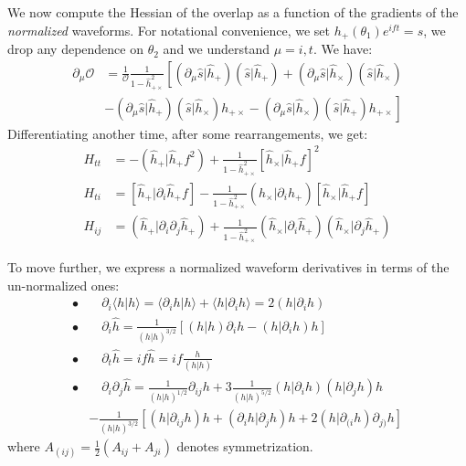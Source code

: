 \documentclass[twocolumn,showpacs,preprintnumbers,nofootinbib,prd,
superscriptaddress,10pt]{revtex4-2}
\newcommand{\scalar}[2]{\langle #1|#2 \rangle}
\newcommand{\rescalar}[2]{( #1 |#2 )}
\newcommand{\imscalar}[2]{[ #1|#2 ]}
\begin{document}
We now compute the Hessian of the overlap as a function of the gradients of the {\it normalized} waveforms. For notational convenience, we set $h_+(\theta_1)e^{ift} = s$, we drop any dependence on $\theta_2$ and we understand $\mu = {i, t}$.
We have:
\begin{align}\label{eq:overlap_grads}
	\partial_{\mu} \mathcal{O} &= \frac{1}{\mathcal{O}} \frac{1}{1-\hat{h}^2_{+\times}}
	\left[
	\rescalar{\partial_\mu\hat{s}}{\hat{h}_+}\rescalar{\hat{s}}{\hat{h}_+} 
	+ \rescalar{\partial_\mu\hat{s}}{\hat{h}_\times}\rescalar{\hat{s}}{\hat{h}_\times} \right. \nonumber \\
	&\left. - \rescalar{\partial_\mu\hat{s}}{\hat{h}_+}\rescalar{\hat{s}}{\hat{h}_\times}h_{+\times}
	- \rescalar{\partial_\mu\hat{s}}{\hat{h}_\times}\rescalar{\hat{s}}{\hat{h}_+}h_{+\times}
	\right]
\end{align}
Differentiating another time, after some rearrangements, we get:
\begin{align}
H_{tt} &= - \rescalar{\hat{h}_+}{\hat{h}_+f^2}
			+ \frac{1}{1-\hat{h}^2_{+\times}} \imscalar{\hat{h}_\times}{\hat{h}_+f}^2 \label{eq:H_tt}\\
H_{ti} &= \imscalar{\hat{h}_+}{\partial_i \hat{h}_+f}
			- \frac{1}{1-\hat{h}^2_{+\times}} \rescalar{\hat{h}_\times}{\partial_i\hat{h}_+} \imscalar{\hat{h}_\times}{\hat{h}_+f} \label{eq:H_ti}\\
H_{ij} &= \rescalar{\hat{h}_+}{\partial_i\partial_j\hat{h}_+}
			+ \frac{1}{1-\hat{h}^2_{+\times}} \rescalar{\hat{h}_\times}{\partial_i\hat{h}_+} \rescalar{\hat{h}_\times}{\partial_j\hat{h}_+} \label{eq:H_ij}
\end{align}

To move further, we express a normalized waveform derivatives in terms of the un-normalized ones:
\begin{align*}
	\bullet&\quad \partial_i \scalar{h}{h} = \scalar{\partial_i h}{h}+ \scalar{h}{\partial_i h} = 2 \rescalar{h}{\partial_i h} \\
	\bullet&\quad \partial_i \hat{h} =\frac{1}{\rescalar{h}{h}^{3/2}} \left[ \rescalar{h}{h}\partial_i h -  \rescalar{h}{\partial_i h} h \right]
	\\
	\bullet &\quad \partial_t \hat{h} = i f \hat{h} = i f \frac{h}{\rescalar{h}{h}} \\
	\bullet &\quad \partial_i \partial_j \hat{h} = \frac{1}{\rescalar{h}{h}^{1/2}} \partial_{ij}h 	+3 \frac{1}{\rescalar{h}{h}^{5/2}} \rescalar{h}{\partial_i h}\rescalar{h}{\partial_j h}h \\
	&- \frac{1}{\rescalar{h}{h}^{3/2}} \left[\rescalar{h}{ \partial_{ij} h} h + \rescalar{\partial_i h}{\partial_j h}  h
		+2\rescalar{h}{\partial_{(i} h} \partial_{j)} h \right]
\end{align*}
where $A_{(ij)} = \frac{1}{2}(A_{ij}+A_{ji})$ denotes symmetrization.
\end{document}
